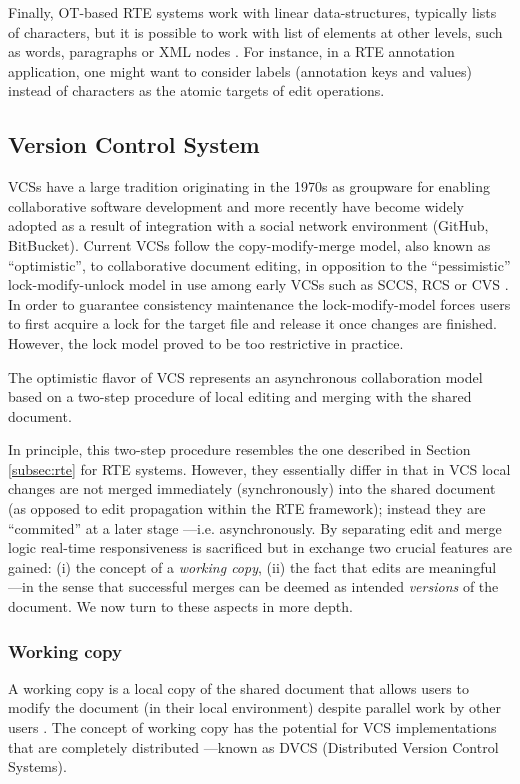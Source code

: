 \documentclass{sig-alternate}
\begin{document}
Finally, OT-based RTE systems work with linear data-structures, typically lists of
characters, but it is possible to work with list of elements at other levels, such as words,
paragraphs or XML nodes \cite{Imine2009,SuClarence}. For instance, in a RTE annotation application,
one might want to consider labels (annotation keys and values) instead of characters as the
atomic targets of edit operations.


\subsection{Version Control System}\label{subsec:vcs}

VCSs have a large tradition originating in the 1970s as groupware for enabling collaborative
software development and more recently have become widely adopted as a result of
integration with a social network environment (GitHub, BitBucket).
Current VCSs follow the copy-modify-merge model, also known as ``optimistic'', to
collaborative document editing, in opposition to the ``pessimistic'' lock-modify-unlock model
in use among early VCSs such as SCCS, RCS or CVS \cite{Loeliger2012}.
In order to guarantee consistency maintenance the lock-modify-model forces users to first
acquire a lock for the target file and release it once changes are finished. However, 
the lock model proved to be too restrictive in practice.

The optimistic flavor of VCS represents an asynchronous collaboration model based on a
two-step procedure of local editing and merging with the shared document.

In principle, this two-step procedure resembles the one described in Section \ref{subsec:rte}
for RTE systems. However, they essentially differ in that in VCS local changes are not merged
immediately (synchronously) into the shared document (as opposed to edit propagation
within the RTE framework); instead they are ``commited'' at a later stage ---i.e. asynchronously.
By separating edit and merge logic real-time responsiveness is
sacrificed but in exchange two crucial features are gained: (i) the concept of a
\textit{working copy}, (ii) the fact that edits are meaningful ---in the sense
that successful merges can be deemed as intended \textit{versions} of the document.
We now turn to these aspects in more depth.

\subsubsection{Working copy}\label{subsec:workingcopy}
A working copy is a local copy of the shared document that allows users
to modify the document (in their local environment) despite parallel work by other users
\cite{Collins-Sussman}. The concept of working copy has the potential for VCS implementations
that are completely distributed ---known as DVCS (Distributed Version Control Systems).
\end{document}

